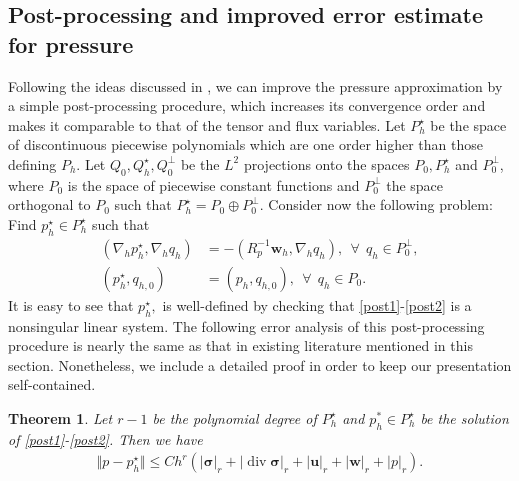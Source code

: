 \documentclass[11pt]{amsart}
\newtheorem{theorem}{Theorem}
\theoremstyle{remark}
\theoremstyle{definition}
\def\sig{{\bm \sigma}}
\def\bu{{\boldsymbol u}}
\def\bw{{\boldsymbol w}}
\renewcommand{\div}{\operatorname{div}}
\renewcommand{\div}{\operatorname{div}}
\def\sig{\boldsymbol \sigma}
\def\bu{\boldsymbol u}
\def\bw{\boldsymbol w}
\begin{document}
\subsection{Post-processing and improved error estimate for pressure}\label{subsec:fem_post_processing} 
%
{
Following the ideas discussed in \cite{arnold1985mixed,bank2019superconvergent,bramble1989local,brandts1994superconvergence,stenberg1991postprocessing,ma2021superconvergence}, we can improve the pressure approximation by a simple post-processing procedure, which increases its convergence order and makes it comparable to that of the tensor and flux variables. 
}
Let $P_h^{\star}$ be the space of discontinuous piecewise polynomials which are one order higher than those defining $P_h$. Let $Q_0, Q_h^\star, Q_0^\perp$ be the $L^2$ projections onto the spaces $P_0, P_h^{\star}$ and $P_0^\perp$, where $P_0$ is the space of piecewise constant functions and $P_0^\perp$ the space orthogonal to $P_0$ such that $P_h^{\star}=P_0\oplus P_0^\perp$. 
Consider now the following problem: Find $p_h^\star\in P_h^{\star}$ such that 
\begin{align}
(\nabla_h p_h^\star, \nabla_h q_h)&=-(R_p^{-1}\bw_h, \nabla_h q_h), ~~\forall~~q_h\in P_0^\perp, \label{post1}\\
(p_h^\star, q_{h,0})&=(p_h, q_{h,0}),~~\forall~~q_h\in P_0\label{post2}.
\end{align}
{
It is easy to see that $p_h^\star,$ is well-defined by checking that
\eqref{post1}-\eqref{post2} is a nonsingular linear system. The following error analysis of this post-processing procedure is nearly the same as that in existing literature mentioned in this section. Nonetheless, we include a detailed proof in order to keep our presentation self-contained.}
\begin{theorem}\label{thm:post}
Let $r-1$ be the polynomial degree of $P_h^{\star}$ and $p_h^* \in P_h^{\star}$ be the solution of \eqref{post1}-\eqref{post2}. Then we have
\begin{align}
\Vert p-p_h^\star\Vert\le C h^r \left(|\sig|_r+|\div\sig|_r+|\bu|_r+|\bw|_r+|p|_r\right).
\end{align}
\end{theorem}
\end{document}
